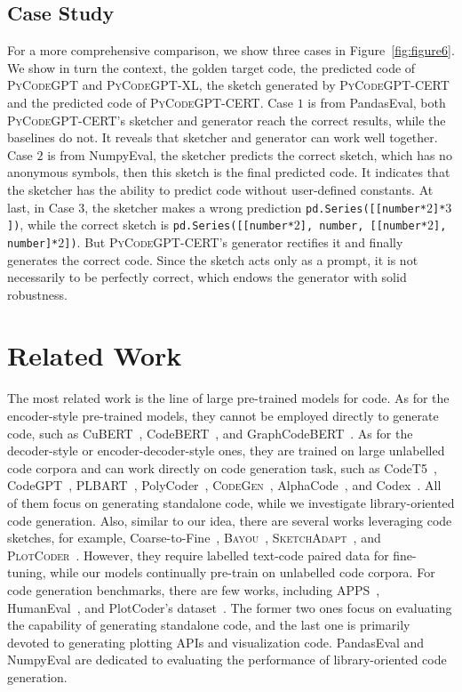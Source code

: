 \documentclass{article}
\newcommand{\cert}{\textsc{CERT}\xspace}
\newcommand{\peval}{PandasEval\xspace}
\newcommand{\neval}{NumpyEval\xspace}
\newcommand{\codepy}{\textsc{PyCodeGPT}\xspace}
\newcommand{\codepyxl}{\textsc{PyCodeGPT}-XL\xspace}
\newcommand{\codegen}{\textsc{CodeGen}\xspace}
\begin{document}
\subsection{Case Study}\label{casestudy}
For a more comprehensive comparison, we show three cases in Figure~\ref{fig:figure6}. We show in turn the context, the golden target code, the predicted code of \codepy and \codepyxl, the sketch generated by \codepy-\cert and the predicted code of \codepy-\cert. Case $1$ is from \peval, both \codepy-\cert's sketcher and generator reach the correct results, while the baselines do not. It reveals that sketcher and generator can work well together. Case $2$ is from \neval, the sketcher predicts the correct sketch, which has no anonymous symbols, then this sketch is the final predicted code. It indicates that the sketcher has the ability to predict code without user-defined constants. At last, in Case $3$, the sketcher makes a wrong prediction {\small\texttt{pd.Series([[number*$2$]*$3$])}}, while the correct sketch is {\small\texttt{pd.Series([[number*$2$], number, [[number*$2$], number]*$2$])}}. But \codepy-\cert's generator rectifies it and finally generates the correct code. Since the sketch acts only as a prompt, it is not necessarily to be perfectly correct, which endows the generator with solid robustness.

\section{Related Work}
The most related work is the line of large pre-trained models for code. As for the encoder-style pre-trained models, they cannot be employed directly to generate code, such as CuBERT~\cite{kanade2020learning}, CodeBERT~\cite{feng2020codebert}, and GraphCodeBERT~\cite{guo2020graphcodebert}. As for the decoder-style or encoder-decoder-style ones, they are trained on large unlabelled code corpora and can work directly on code generation task, such as CodeT5~\cite{wang2021codet5}, CodeGPT~\cite{lu2021codexglue}, PLBART~\cite{ahmad-etal-2021-unified}, PolyCoder~\cite{xu2022PolyCoder}, \codegen~\cite{nijkamp2022conversational}, AlphaCode~\cite{li2022competition}, and Codex~\cite{chen2021evaluating}.
All of them focus on generating standalone code, while we investigate library-oriented code generation. Also, similar to our idea, there are several works leveraging code sketches, for example, Coarse-to-Fine~\cite{dong2018coarse}, \textsc{Bayou}~\cite{murali2017neural}, \textsc{SketchAdapt}~\cite{nye2019learning}, and \textsc{PlotCoder}~\cite{chen2021plotcoder}. 
However, they require labelled text-code paired data for fine-tuning, while our models continually pre-train on unlabelled code corpora.
For code generation benchmarks, there are few works, including APPS~\cite{hendrycks2021measuring}, HumanEval~\cite{chen2021evaluating}, and PlotCoder's dataset~\cite{chen2021plotcoder}. The former two ones focus on evaluating the capability of generating standalone code, and the last one is primarily devoted to generating plotting APIs and visualization code. \peval and \neval are dedicated to evaluating the performance of library-oriented code generation.
\end{document}
